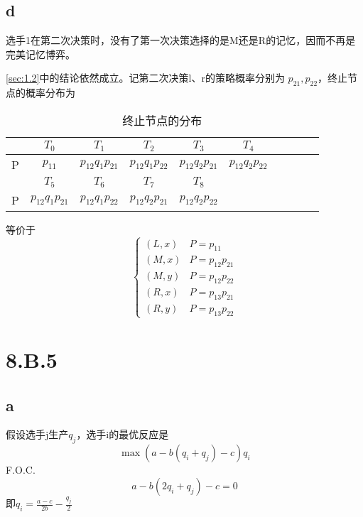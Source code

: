 \documentclass[a4paper,12pt]{article}
\begin{document}
\subsection{d}

选手1在第二次决策时，没有了第一次决策选择的是M还是R的记忆，因而不再是完美记忆博弈。

\ref{sec:1.2}中的结论依然成立。记第二次决策l、r的策略概率分别为 $p_{21},p_{22}$，终止节点的概率分布为
\begin{table}[H]
    \centering
    \begin{tabular}{cccccccccc}
          & $T_0$             & $T_1$             & $T_2$             & $T_3$             & $T_4$             \\\hline
        P & $p_{11}$          & $p_{12}q_1p_{21}$ & $p_{12}q_1p_{22}$ & $p_{12}q_2p_{21}$ & $p_{12}q_2p_{22}$ \\\hline
          & $T_5$             & $T_6$             & $T_7$             & $T_8$                                 \\\hline
        P & $p_{12}q_1p_{21}$ & $p_{12}q_1p_{22}$ & $p_{12}q_2p_{21}$ & $p_{12}q_2p_{22}$                     \\\hline
    \end{tabular}
    \caption{终止节点的分布}
\end{table}

等价于
\begin{equation}
    \begin{cases}
        (L,x) & P=p_{11}       \\
        (M,x) & P=p_{12}p_{21} \\
        (M,y) & P=p_{12}p_{22} \\
        (R,x) & P=p_{13}p_{21} \\
        (R,y) & P=p_{13}p_{22}
    \end{cases}
\end{equation}

\section{8.B.5}

\subsection{a}\label{sec:2a}

假设选手j生产$q_j$，选手i的最优反应是
$$\max (a-b(q_i+q_j)-c)q_i$$
F.O.C.
$$a-b(2q_i+q_j)-c=0$$
即$q_i=\frac{a-c}{2b}-\frac{q_j}{2}$
\end{document}
